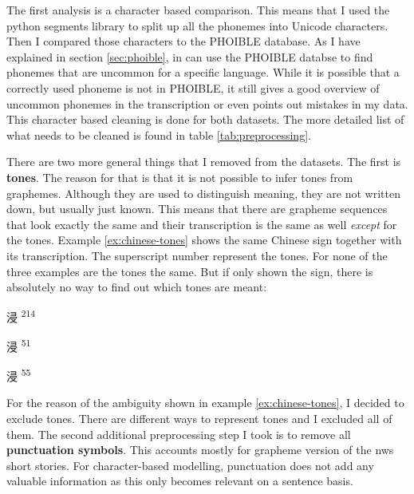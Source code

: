 The first analysis is a character based comparison. This means that I used the python segments library to split up all the phonemes into Unicode characters. Then I compared those characters to the PHOIBLE database. As I have explained in section \ref{sec:phoible}, in can use the PHOIBLE databse to find phonemes that are uncommon for a specific language. While it is possible that a correctly used phoneme is not in PHOIBLE, it still gives a good overview of uncommon phonemes in the transcription or even points out mistakes in my data. This character based cleaning is done for both datasets. The more detailed list of what needs to be cleaned is found in table \ref{tab:preprocessing}.

There are two more general things that I removed from the datasets. The first is \textbf{tones}. The reason for that is that it is not possible to infer tones from graphemes. Although they are used to distinguish meaning, they are not written down, but usually just known. This means that there are grapheme sequences that look exactly the same and their transcription is the same as well \textit{except} for the tones. Example \ref{ex:chinese-tones} shows the same Chinese sign together with its transcription. The superscript number represent the tones. For none of the three examples are the tones the same. But if only shown the sign, there is absolutely no way to find out which tones are meant:

\begin{covsubexamples}
\label{ex:chinese-tones}
\item 
\begin{CJK*}{UTF8}{bsmi}
浸 \>\>\>\> \textsuperscript{2}\textsuperscript{1}\textsuperscript{4}
\end{CJK*}
\item 
\begin{CJK*}{UTF8}{bsmi}
浸 \>\>\>\> \textsuperscript{5}\textsuperscript{1}
\end{CJK*}
\item  
\begin{CJK*}{UTF8}{bsmi}
浸 \>\>\>\> \textsuperscript{5}\textsuperscript{5}
\end{CJK*}
\end{covsubexamples}

For the reason of the ambiguity shown in example \ref{ex:chinese-tones}, I decided to exclude tones. There are different ways to represent tones and I excluded all of them. The second additional preprocessing step I took is to remove all \textbf{punctuation symbols}. This accounts mostly for grapheme version of the \ac{nws} short stories. For character-based modelling, punctuation does not add any valuable information as this only becomes relevant on a sentence basis. 


